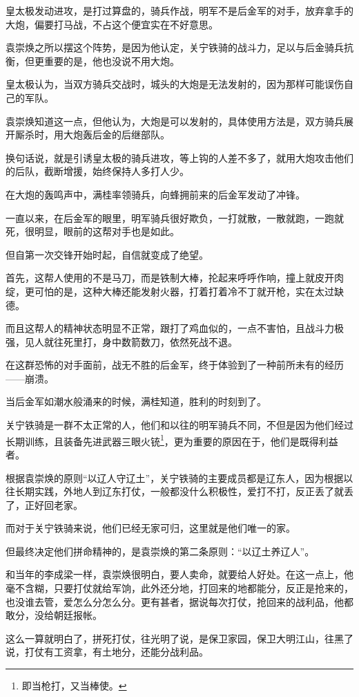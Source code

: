 \begin{multicols}{\theparacolNo}
		皇太极发动进攻，是打过算盘的，骑兵作战，明军不是后金军的对手，放弃拿手的大炮，偏要打马战，不占这个便宜实在不好意思。

		袁崇焕之所以摆这个阵势，是因为他认定，关宁铁骑的战斗力，足以与后金骑兵抗衡，但更重要的是，他也没说不用大炮。

		皇太极认为，当双方骑兵交战时，城头的大炮是无法发射的，因为那样可能误伤自己的军队。

		袁崇焕知道这一点，但他认为，大炮是可以发射的，具体使用方法是，双方骑兵展开厮杀时，用大炮轰后金的后继部队。

		换句话说，就是引诱皇太极的骑兵进攻，等上钩的人差不多了，就用大炮攻击他们的后队，截断增援，始终保持人多打人少。

		在大炮的轰鸣声中，满桂率领骑兵，向蜂拥前来的后金军发动了冲锋。

		一直以来，在后金军的眼里，明军骑兵很好欺负，一打就散，一散就跑，一跑就死，很明显，眼前的这帮对手也是如此。

		但自第一次交锋开始时起，自信就变成了绝望。

		首先，这帮人使用的不是马刀，而是铁制大棒，抡起来呼呼作响，撞上就皮开肉绽，更可怕的是，这种大棒还能发射火器，打着打着冷不丁就开枪，实在太过缺德。

		而且这帮人的精神状态明显不正常，跟打了鸡血似的，一点不害怕，且战斗力极强，见人就往死里打，身中数箭数刀，依然死战不退。

		在这群恐怖的对手面前，战无不胜的后金军，终于体验到了一种前所未有的经历——崩溃。

		当后金军如潮水般涌来的时候，满桂知道，胜利的时刻到了。

		关宁铁骑是一群不太正常的人，他们和以往的明军骑兵不同，不但是因为他们经过长期训练，且装备先进武器三眼火铳\footnote{即当枪打，又当棒使。}，更为重要的原因在于，他们是既得利益者。

		根据袁崇焕的原则“以辽人守辽土”，关宁铁骑的主要成员都是辽东人，因为根据以往长期实践，外地人到辽东打仗，一般都没什么积极性，爱打不打，反正丢了就丢了，正好回老家。

		而对于关宁铁骑来说，他们已经无家可归，这里就是他们唯一的家。

		但最终决定他们拼命精神的，是袁崇焕的第二条原则：“以辽土养辽人”。

		和当年的李成梁一样，袁崇焕很明白，要人卖命，就要给人好处。在这一点上，他毫不含糊，只要打仗就给军饷，此外还分地，打回来的地都能分，反正是抢来的，也没谁去管，爱怎么分怎么分。更有甚者，据说每次打仗，抢回来的战利品，他都敢分，没给朝廷报帐。

		这么一算就明白了，拼死打仗，往光明了说，是保卫家园，保卫大明江山，往黑了说，打仗有工资拿，有土地分，还能分战利品。


\end{multicols}
